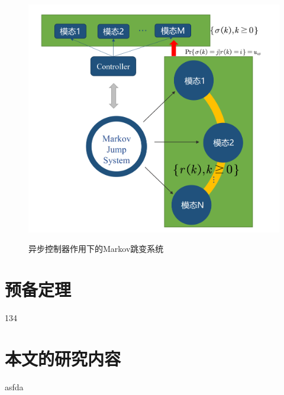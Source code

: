 	\begin{figure}[!htb] 
		\centering\includegraphics[scale=0.12]{./figures/introduction/asynsys.png}\\ 
		\caption{异步控制器作用下的Markov跳变系统}
		\label{intro_fig_asynsys}
	\end{figure}
	
\section{预备定理}
134
\section{本文的研究内容}
asfda